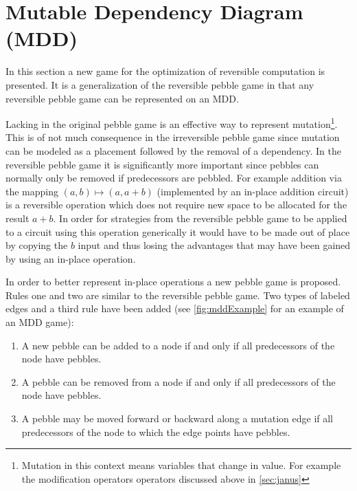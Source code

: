 \section{Mutable Dependency Diagram (MDD)} 


In this section a new game for the optimization of reversible computation is
presented. It is a generalization of the reversible pebble game in that any
reversible pebble game can be represented on an MDD. 

Lacking in the original pebble game is an effective way to represent
mutation\footnote{Mutation in this context means variables that change in
value. For example the modification operators operators discussed above in
\cref{sec:janus}}. This is of not much consequence in the irreversible pebble
game since mutation can be modeled as a placement followed by the removal of a
dependency. In the reversible pebble game it is significantly more important
since pebbles can normally only be removed if predecessors are pebbled. For
example addition via the mapping $(a,b) \mapsto (a,a+b)$ (implemented by an
in-place addition circuit) is a reversible operation which does not require new
space to be allocated for the result $a+b$.  In order for strategies from the
reversible pebble game to be applied to a circuit using this operation
generically it would have to be made out of place by copying the $b$ input and
thus losing the advantages that may have been gained by using an in-place
operation.

In order to better represent in-place operations a new pebble game is proposed.
Rules one and two are similar to the reversible pebble game. Two types of labeled edges and a third rule
have been added (see \cref{fig:mddExample} for an example of an MDD game):


\begin{enumerate}

   \item A new pebble can be added to a node if and only if all predecessors of
     the node have pebbles.

   \item A pebble can be removed from a node if and only if all predecessors of
     the node have pebbles.

   \item A pebble may be moved forward or backward along a mutation edge if all
     predecessors of the node to which the edge points have pebbles.

\end{enumerate}

